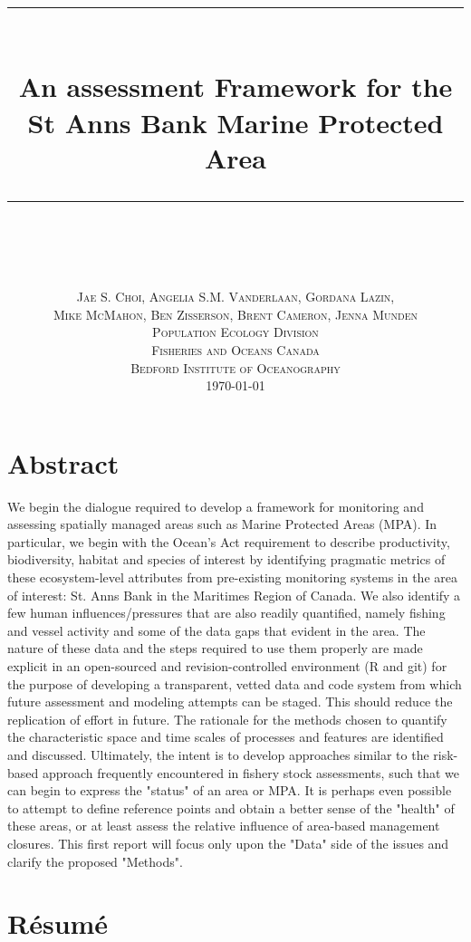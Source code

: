 \documentclass[letterpaper,portrait,11pt]{scrartcl}
\title{
    \usefont{OT1}{bch}{b}{n}
    \rule{\linewidth}{0.5pt} \\[0.4cm]
    \huge An assessment Framework for the St Anns Bank Marine Protected Area  \\
    \rule{\linewidth}{2pt} \\[1.0cm]
}
\author{
    \normalfont \normalsize  \textsc{Jae S. Choi, Angelia S.M. Vanderlaan, Gordana Lazin,} \\
    \normalfont \normalsize  \textsc{Mike McMahon,  Ben Zisserson, Brent Cameron, Jenna Munden} \\ [25pt]   
    \normalfont \normalsize \textsc{Population Ecology Division} \\ 
    \normalfont \normalsize \textsc{Fisheries and Oceans Canada} \\ 
    \normalfont \normalsize \textsc{Bedford Institute of Oceanography} \\ [25pt]
    \normalsize \textsc{\today}
}
\numberwithin{equation}{section}    %
\numberwithin{figure}{section}    %
\numberwithin{table}{section}       %
\begin{document}
\setcounter{page}{3}

\section*{Abstract}

We begin the dialogue required to develop a framework for monitoring and assessing spatially managed areas such as Marine Protected Areas (MPA). In particular, we begin with the Ocean's Act requirement to describe productivity, biodiversity, habitat and species of interest by identifying pragmatic metrics of these ecosystem-level attributes from pre-existing monitoring systems in the area of interest: St. Anns Bank in the Maritimes Region of Canada. We also identify a few human influences/pressures that are also readily quantified, namely fishing and vessel activity and some of the data gaps that evident in the area. The nature of these data and the steps required to use them properly are made explicit in an open-sourced and revision-controlled environment (R and git) for the purpose of developing a transparent, vetted data and code system from which future assessment and modeling attempts can be staged. This should reduce the replication of effort in future. The rationale for the methods chosen to quantify the characteristic space and time scales of processes and features are identified and discussed. Ultimately, the intent is to develop approaches similar to the risk-based approach frequently encountered in fishery stock assessments, such that we can begin to express the "status" of an area or MPA. It is perhaps even possible to attempt to define reference points and obtain a better sense of the "health" of these areas, or at least assess the relative influence of area-based management closures. This first report will focus only upon the "Data" side of the issues and clarify the proposed "Methods". 


\newpage
\section*{R\'{e}sum\'{e}}
\end{document}
